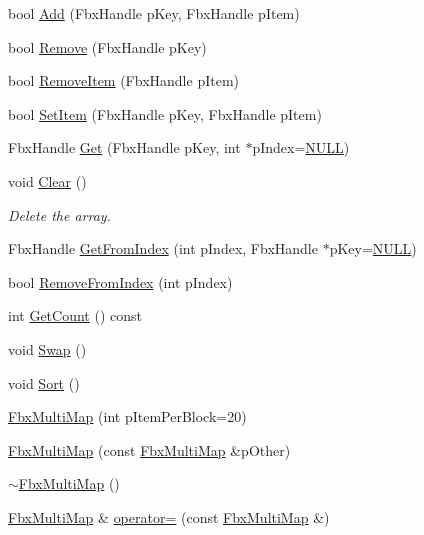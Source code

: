\begin{DoxyCompactItemize}
\item 
bool \hyperlink{class_fbx_multi_map_af2a311d7518a76cf06ac5f2ce84d597a}{Add} (Fbx\+Handle p\+Key, Fbx\+Handle p\+Item)
\item 
bool \hyperlink{class_fbx_multi_map_a373841e60d39a284ea1bc33df94627e7}{Remove} (Fbx\+Handle p\+Key)
\item 
bool \hyperlink{class_fbx_multi_map_a6aa9b2ddee4842a0547430264fa9caa1}{Remove\+Item} (Fbx\+Handle p\+Item)
\item 
bool \hyperlink{class_fbx_multi_map_a33b8107d8815b1628aa6e743349ac00a}{Set\+Item} (Fbx\+Handle p\+Key, Fbx\+Handle p\+Item)
\item 
Fbx\+Handle \hyperlink{class_fbx_multi_map_af0a42e2b8786d36bf7942318b9b89201}{Get} (Fbx\+Handle p\+Key, int $\ast$p\+Index=\hyperlink{fbxarch_8h_a070d2ce7b6bb7e5c05602aa8c308d0c4}{N\+U\+LL})
\item 
void \hyperlink{class_fbx_multi_map_add121708bf4b592eecf823eee98ed841}{Clear} ()
\begin{DoxyCompactList}\small\item\em Delete the array. \end{DoxyCompactList}\item 
Fbx\+Handle \hyperlink{class_fbx_multi_map_a335ac1a6e65c336cdcb06cb425bec932}{Get\+From\+Index} (int p\+Index, Fbx\+Handle $\ast$p\+Key=\hyperlink{fbxarch_8h_a070d2ce7b6bb7e5c05602aa8c308d0c4}{N\+U\+LL})
\item 
bool \hyperlink{class_fbx_multi_map_a8511db42672da436f2c385171ca6f174}{Remove\+From\+Index} (int p\+Index)
\item 
int \hyperlink{class_fbx_multi_map_a5e496eeb0e6154087fd2259539c16782}{Get\+Count} () const
\item 
void \hyperlink{class_fbx_multi_map_a6a70e16ab207c85ab270fd779642667d}{Swap} ()
\item 
void \hyperlink{class_fbx_multi_map_affec6231b7c9cc7455c8ad9b8106332a}{Sort} ()
\item 
\hyperlink{class_fbx_multi_map_abc46e5413a8ad6b460a480a5f2ccf7bb}{Fbx\+Multi\+Map} (int p\+Item\+Per\+Block=20)
\item 
\hyperlink{class_fbx_multi_map_a1cb167013e1385a004bf17b95019b985}{Fbx\+Multi\+Map} (const \hyperlink{class_fbx_multi_map}{Fbx\+Multi\+Map} \&p\+Other)
\item 
\hyperlink{class_fbx_multi_map_a33cf2b491ba6926b6a7704fd3b50f997}{$\sim$\+Fbx\+Multi\+Map} ()
\item 
\hyperlink{class_fbx_multi_map}{Fbx\+Multi\+Map} \& \hyperlink{class_fbx_multi_map_a0ac91f5605bff211cce31dc46aa97a92}{operator=} (const \hyperlink{class_fbx_multi_map}{Fbx\+Multi\+Map} \&)
\end{DoxyCompactItemize}


